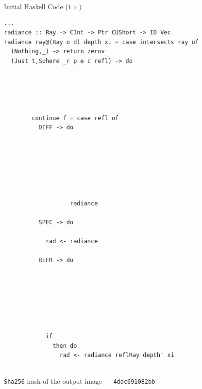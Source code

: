 \documentclass[8pt]{beamer}
\newcommand{\raw}[1]{\texttt{#1}}
\begin{document}
\begin{frame}[fragile]{Initial Haskell Code ($1\times$)}
\begin{verbatim}
...
radiance :: Ray -> CInt -> Ptr CUShort -> IO Vec
radiance ray@(Ray o d) depth xi = case intersects ray of
  (Nothing,_) -> return zerov
  (Just t,Sphere _r p e c refl) -> do
                                        
                                   
                                                              
                         
                                
        continue f = case refl of
          DIFF -> do
                                                
                               
                                
                                      
                                                                                           
                                  
                                                                                                                
                   radiance 
                                            
          SPEC -> do
                                                         
            rad <- radiance 
                                            
          REFR -> do
                                                                                                     
                                                                                   
                         
                           
                                                      
                                
                                                
            if 
              then do
                rad <- radiance reflRay depth' xi
                                                
\end{verbatim}

\raw{Sha256} hash of the output image --- \raw{4dac691082bb}
\end{frame}
\end{document}
